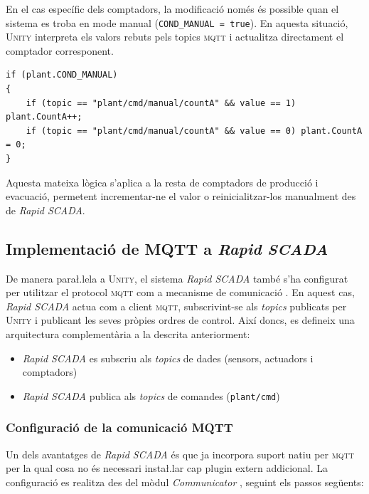 \documentclass[a4paper,11pt,DIV=13,headings=normal,abstract=true,twoside=semi]{article}
\newcommand{\acro}[1]{\textsc{#1}}
\begin{document}
En el cas específic dels comptadors, la modificació només és possible quan el sistema es troba en mode manual (\texttt{COND\_MANUAL = true}). En aquesta situació, \acro{Unity} interpreta els valors rebuts pels topics \acro{mqtt} i actualitza directament el comptador corresponent.

\begin{lstlisting}[style=simple]
if (plant.COND_MANUAL)
{
    if (topic == "plant/cmd/manual/countA" && value == 1) plant.CountA++;
    if (topic == "plant/cmd/manual/countA" && value == 0) plant.CountA = 0;
}
\end{lstlisting}

Aquesta mateixa lògica s'aplica a la resta de comptadors de producció i evacuació, permetent incrementar-ne el valor o reinicialitzar-los manualment des de \emph{Rapid SCADA}. 

\subsection{Implementació de MQTT a \emph{Rapid SCADA}}

De manera para\l.lela a \acro{Unity}, el sistema \emph{Rapid SCADA} també s'ha configurat per utilitzar el protocol \acro{mqtt} com a mecanisme de comunicació \cite{RapidScadaVideos}. En aquest cas, \emph{Rapid SCADA} actua com a client \acro{mqtt}, subscrivint-se als \emph{topics} publicats per \acro{Unity} i publicant les seves pròpies ordres de control. Així doncs, es defineix una arquitectura complementària a la descrita anteriorment:
\begin{itemize}
    \item \emph{Rapid SCADA} es subscriu als \emph{topics} de dades (sensors, actuadors i comptadors)
    \item \emph{Rapid SCADA} publica als \emph{topics} de comandes (\texttt{plant/cmd})
\end{itemize}

\subsubsection*{Configuració de la comunicació MQTT}

Un dels avantatges de \emph{Rapid SCADA} és que ja incorpora suport natiu per \acro{mqtt}  per la qual cosa no és necessari insta\l.lar cap plugin extern addicional. La configuració es realitza des del mòdul \emph{Communicator} \cite{rapidscada_device_polling}, seguint els passos següents:
\end{document}
